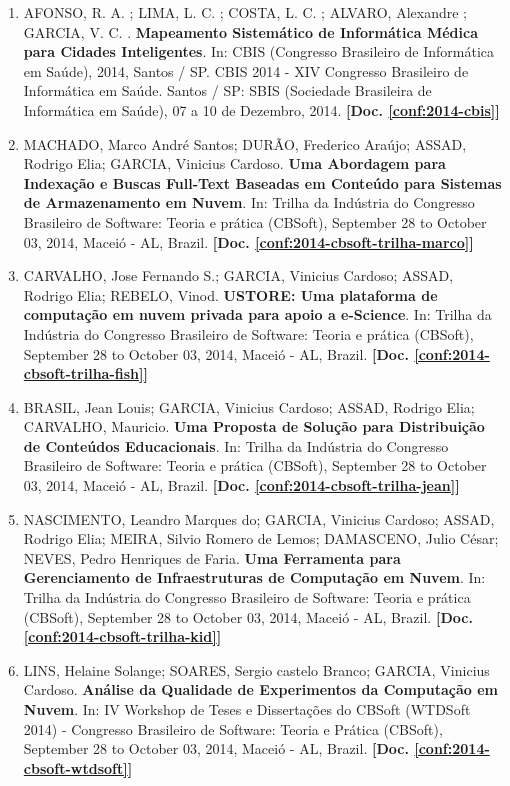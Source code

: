 \documentclass[a4paper,oneside,10pt]{article}
\begin{document}
\begin{enumerate}
\item AFONSO, R. A. ; LIMA, L. C. ; COSTA, L. C. ; ALVARO, Alexandre ; GARCIA, V. C. . \textbf{Mapeamento Sistemático de Informática Médica para Cidades Inteligentes}. In: CBIS (Congresso Brasileiro de Informática em Saúde), 2014, Santos / SP. CBIS 2014 - XIV Congresso Brasileiro de Informática em Saúde. Santos / SP: SBIS (Sociedade Brasileira de Informática em Saúde), 07 a 10 de Dezembro, 2014. \textbf{[Doc. \ref{conf:2014-cbis}]}

\item MACHADO, Marco André Santos; DURÃO, Frederico Araújo; ASSAD, Rodrigo Elia; GARCIA, Vinicius Cardoso. \textbf{Uma Abordagem para Indexação e Buscas Full-Text Baseadas em Conteúdo para Sistemas de Armazenamento em Nuvem}. In: Trilha da Indústria do Congresso Brasileiro de Software: Teoria e prática (CBSoft), September 28 to October 03, 2014, Maceió - AL, Brazil. \textbf{[Doc. \ref{conf:2014-cbsoft-trilha-marco}]}

\item CARVALHO, Jose Fernando S.; GARCIA, Vinicius Cardoso; ASSAD, Rodrigo Elia; REBELO, Vinod. \textbf{USTORE: Uma plataforma de computação em nuvem privada para apoio a e-Science}. In: Trilha da Indústria do Congresso Brasileiro de Software: Teoria e prática (CBSoft), September 28 to October 03, 2014, Maceió - AL, Brazil. \textbf{[Doc. \ref{conf:2014-cbsoft-trilha-fish}]}

\item BRASIL, Jean Louis; GARCIA, Vinicius Cardoso; ASSAD, Rodrigo Elia; CARVALHO, Mauricio. \textbf{Uma Proposta de Solução para Distribuição de Conteúdos Educacionais}. In: Trilha da Indústria do Congresso Brasileiro de Software: Teoria e prática (CBSoft), September 28 to October 03, 2014, Maceió - AL, Brazil. \textbf{[Doc. \ref{conf:2014-cbsoft-trilha-jean}]}

\item NASCIMENTO, Leandro Marques do; GARCIA, Vinicius Cardoso; ASSAD, Rodrigo Elia; MEIRA, Silvio Romero de Lemos; DAMASCENO, Julio César; NEVES, Pedro Henriques de Faria. \textbf{Uma Ferramenta para Gerenciamento de Infraestruturas de Computação em Nuvem}. In: Trilha da Indústria do Congresso Brasileiro de Software: Teoria e prática (CBSoft), September 28 to October 03, 2014, Maceió - AL, Brazil. \textbf{[Doc. \ref{conf:2014-cbsoft-trilha-kid}]}

\item LINS, Helaine Solange; SOARES, Sergio castelo Branco; GARCIA, Vinicius Cardoso. \textbf{Análise da Qualidade de Experimentos da Computação em Nuvem}. In: IV Workshop de Teses e Dissertações do CBSoft (WTDSoft 2014) - Congresso Brasileiro de Software: Teoria e Prática (CBSoft), September 28 to October 03, 2014, Maceió - AL, Brazil. \textbf{[Doc. \ref{conf:2014-cbsoft-wtdsoft}]}


\end{enumerate}
\end{document}

